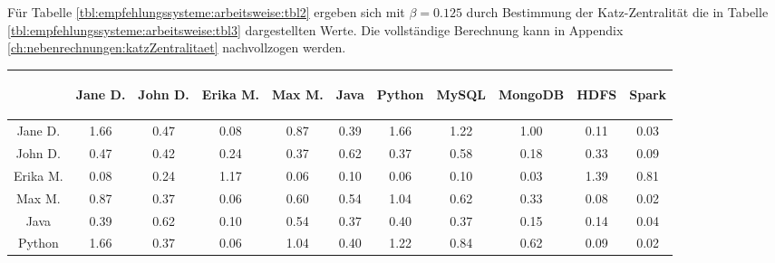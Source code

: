 
Für Tabelle \ref{tbl:empfehlungssysteme:arbeitsweise:tbl2} ergeben sich mit $\beta = 0.125$ durch Bestimmung der Katz-Zentralität die in Tabelle \ref{tbl:empfehlungssysteme:arbeitsweise:tbl3} dargestellten Werte. Die vollständige Berechnung kann in Appendix \ref{ch:nebenrechnungen:katzZentralitaet} nachvollzogen werden.
\newpage
\begin{table}[h]
	\centering
	\begin{tabular}{c|c|c|c|c|c|c|c|c|c|c}
		& \begin{sideways}Jane D.\end{sideways} & \begin{sideways}John D.\end{sideways} & \begin{sideways}Erika M.\end{sideways} & \begin{sideways}Max M.\end{sideways} & \begin{sideways}Java\end{sideways} & \begin{sideways}Python\end{sideways} & \begin{sideways}MySQL\end{sideways} & \begin{sideways}MongoDB\end{sideways} & \begin{sideways}HDFS\end{sideways} & \begin{sideways}Spark\end{sideways} \\ 
		\hline
		Jane D.  & 1.66 & 0.47 & 0.08 & 0.87 & 0.39 & 1.66 & 1.22 & 1.00 & 0.11 & 0.03\\
		John D.  & 0.47 & 0.42 & 0.24 & 0.37 & 0.62 & 0.37 & 0.58 & 0.18 & 0.33 & 0.09\\
		Erika M. & 0.08 & 0.24 & 1.17 & 0.06 & 0.10 & 0.06 & 0.10 & 0.03 & 1.39 & 0.81\\
		Max M.   & 0.87 & 0.37 & 0.06 & 0.60 & 0.54 & 1.04 & 0.62 & 0.33 & 0.08 & 0.02\\
		Java     & 0.39 & 0.62 & 0.10 & 0.54 & 0.37 & 0.40 & 0.37 & 0.15 & 0.14 & 0.04\\
		Python   & 1.66 & 0.37 & 0.06 & 1.04 & 0.40 & 1.22 & 0.84 & 0.62 & 0.09 & 0.02\\

\end{tabular}
\end{table}

